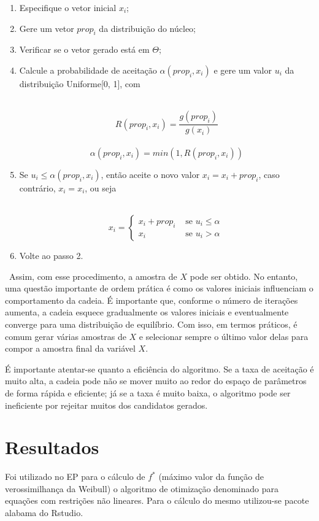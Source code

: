 \documentclass{article} %
\begin{document}
\begin{enumerate}
\item Especifique o vetor inicial $x_{i}$;
\item Gere um vetor $prop_{i}$ da distribuição do núcleo;
\item Verificar se o vetor gerado está em $\Theta$;
\item Calcule a probabilidade de aceitação $\alpha(prop_{i}, x_{i})$ e gere um valor $u_{i}$ da distribuição Uniforme[0, 1], com

\ $$R(prop_{i}, x_{i}) = \frac{g(prop_{i})}{g(x_{i})}$$
\ $$\alpha(prop_{i}, x_{i}) = min(1 , R(prop_{i}, x_{i}))$$

\item Se $u_{i} \leq \alpha(prop_{i}, x_{i})$, então aceite o novo valor $x_{i} = x_{i} + prop_{i}$, caso contrário, $x_{i} = x_{i}$, ou seja

\ $$x_{i} = \left\{ \begin{array}{ll}
x_{i} + prop_{i} & \mbox{ se } u_{i} \leq \alpha \\
x_{i} & \mbox{ se } u_{i} > \alpha \end{array} \right.\ $$

\item Volte ao passo 2.
\end{enumerate}

\ Assim, com esse procedimento, a amostra de $X$ pode ser obtido. No entanto, uma questão importante de ordem prática é como os valores iniciais influenciam o comportamento da cadeia. É importante que, conforme o número de iterações aumenta, a cadeia esquece gradualmente os valores iniciais e eventualmente converge para uma distribuição de equilíbrio. Com isso, em termos práticos, é comum gerar várias amostras de $X$ e selecionar sempre o último valor delas para compor a amostra final da variável $X$.

É importante atentar-se quanto a eficiência do algoritmo. Se a taxa de aceitação é muito alta, a cadeia pode não se mover muito ao redor do espaço de parâmetros de forma rápida e eficiente; já se a taxa é muito baixa, o algoritmo pode ser ineficiente por rejeitar muitos dos candidatos gerados.

	
\section{Resultados}
	
	 Foi utilizado no EP para o cálculo de $f^*$ (máximo valor da função de verossimilhança da Weibull) o algoritmo de otimização denominado para equações com restrições não lineares. Para o cálculo do mesmo utilizou-se pacote alabama do Rstudio.
     
\end{document}
